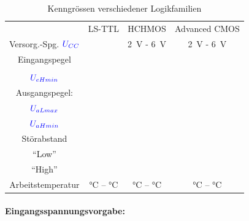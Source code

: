 \documentclass[11pt,a4paper,titlepage,parskip=half]{scrreprt}
\begin{document}
        \begin{center}
          \begin{table}[H]
            \caption{Kenngrössen verschiedener Logikfamilien}
              \label{tbl:Kenngroessen}
              \renewcommand{\arraystretch}{1.6}
              \begin{center}
                \begin{tabular}{c| c|c|c}
                  & LS-TTL & HCHMOS & Advanced CMOS\\
                  Versorg.-Spg. $\textcolor{blue}{U_{CC}}$ & \qquad\qquad\qquad & \SI{2}{\volt} - \SI{6}{\volt} & \SI{2}{\volt} - \SI{6}{\volt}\\ \hline
                  Eingangspegel &\qquad\qquad\qquad&\qquad\qquad\qquad&\qquad\qquad\qquad\\ 
                  & &  & \\ \hline
                  $\textcolor{blue}{U_{eHmin}}$&&&\\ \hline
                  Ausgangspegel:&&& \\
                  $\textcolor{blue}{U_{aLmax}}$&&& \\ \hline
                  $\textcolor{blue}{U_{aHmin}}$&&&\\ \hline
                  Störabstand &&&\\ 
                  "`Low"' & & & \\ \hline
                  "`High"' & & & \\ \hline
                  Arbeitstemperatur & \qquad\si{\degreeCelsius} -- \qquad\si{\degreeCelsius} & \qquad\si{\degreeCelsius} -- \qquad\si{\degreeCelsius} & \qquad\si{\degreeCelsius} -- \qquad\si{\degreeCelsius}
                \end{tabular}
              \end{center}
          \end{table}
        \end{center}

      \paragraph{Eingangsspannungsvorgabe:}
\end{document}
